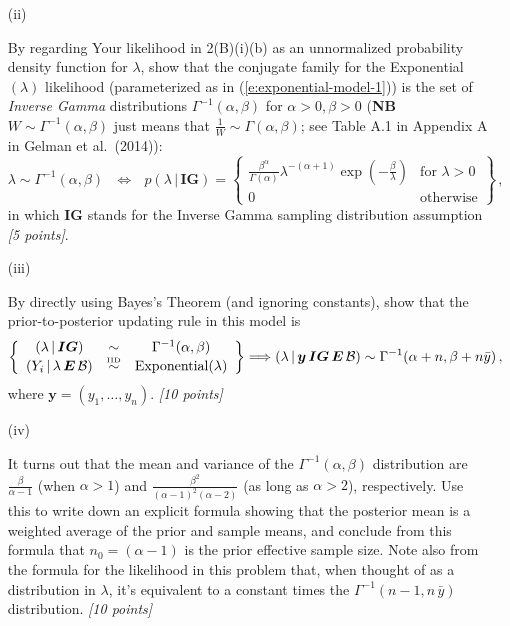 \documentclass[12pt]{article}
\newcommand{\given}{\, | \,}
\begin{document}
\begin{itemize}
\begin{itemize}
\begin{itemize}
\end{itemize}

\item[(ii)]

By regarding Your likelihood in 2(B)(i)(b) as an unnormalized probability density function for $\lambda$, show that the conjugate family for the Exponential$( \lambda )$ likelihood (parameterized as in (\ref{e:exponential-model-1})) is the set of \textit{Inverse Gamma} distributions $\Gamma^{ -1 } ( \alpha, \beta )$ for $\alpha > 0, \beta > 0$ (\textbf{NB} $W \sim \Gamma^{ -1 } ( \alpha, \beta )$ just means that $\frac{ 1 }{ W } \sim \Gamma ( \alpha, \beta )$; see Table A.1 in Appendix A in Gelman et al.~(2014)):
\begin{equation} \label{e:inverse-gamma-1}
\lambda \sim \Gamma^{ -1 } ( \alpha, \beta ) \ \ \ \iff \ \ \ p ( \lambda \given \bm{ IG } ) = \left\{ \begin{array}{cc} \frac{ \beta^\alpha }{ \Gamma ( \alpha ) }
\lambda^{ - ( \alpha + 1 ) } \exp \left( - \frac{ \beta }{ \lambda } \right)
& \textrm{for } \lambda > 0 \\ 0 & \mbox{otherwise} \end{array} \right\} \, ,
\end{equation}
in which $\bm{ IG }$ stands for the Inverse Gamma sampling distribution assumption \textit{[5 points]}.

\item[(iii)]

By directly using Bayes's Theorem (and ignoring constants), show that
the prior-to-posterior updating rule in this model is
\begin{equation} \label{e:updating-1}
\left\{ \begin{array}{ccc} ( \lambda \given \bm{ IG } )& \sim & \Gamma^{ -1 } ( \alpha, \beta )
\\ ( Y_i \given \lambda \, \bm{ E } \, \mathcal{ B } ) & \stackrel{ \mbox{\tiny IID} }{ \sim } & \textrm{Exponential} ( \lambda ) \end{array} \right\} \Longrightarrow ( \lambda \given \bm{ y } \, \bm{ IG } \, \bm{ E } \, \mathcal{ B } ) \sim \Gamma^{ -1 } ( \alpha + n, \beta + n \bar{ y } ) \, ,
\end{equation}
where $\bm{ y } = ( y_1, \dots, y_n )$. \textit{[10 points]}

\item[(iv)]

It turns out that the mean and variance of the $\Gamma^{ -1 } (
\alpha, \beta )$ distribution are $\frac{ \beta }{ \alpha - 1}$ (when $\alpha > 1$) and $\frac{ \beta^2 }{ ( \alpha - 1 )^2 ( \alpha - 2 ) }$ (as long as
$\alpha > 2$), respectively. Use this to write down an explicit formula showing that the posterior mean is a weighted average of the prior and sample means, and
conclude from this formula that $n_0 = ( \alpha - 1 )$ is the prior effective
sample size. Note also from the formula for the likelihood in this problem
that, when thought of as a distribution in $\lambda$, it's equivalent to a
constant times the $\Gamma^{ -1 } ( n - 1, n \, \bar{ y } )$ distribution. \textit{[10 points]} 


\end{itemize}
\end{itemize}
\end{document}
